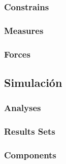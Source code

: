         
        \subsubsection{Constrains}
        
        \subsubsection{Measures}
        
        \subsubsection{Forces}
        
    
    \subsection{Simulación}
    
        \subsubsection{Analyses}
        
        \subsubsection{Results Sets}
        
        \subsubsection{Components}
    
            
    
    
    



    
    


    

    
    

    

    
      
        
            
            
            

        
    
    